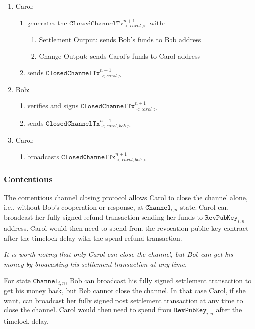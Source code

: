 \documentclass{llncs}
\begin{document}
\begin{enumerate}
\item Carol:
  \begin{enumerate}
  \item generates the $\texttt{ClosedChannelTx}_{<carol>}^{n+1}$ with:
    \begin{enumerate}
    \item Settlement Output: sends Bob's funds to Bob address
    \item Change Output: sends Carol's funds to Carol address
    \end{enumerate}
  \item sends $\texttt{ClosedChannelTx}_{<carol>}^{n+1}$
  \end{enumerate}
\item Bob:
  \begin{enumerate}
  \item verifies and signs $\texttt{ClosedChannelTx}_{<carol>}^{n+1}$
  \item sends $\texttt{ClosedChannelTx}_{<carol,bob>}^{n+1}$
  \end{enumerate}
\item Carol:
  \begin{enumerate}
  \item broadcasts $\texttt{ClosedChannelTx}_{<carol,bob>}^{n+1}$
  \end{enumerate}
\end{enumerate}

\subsubsection{Contentious} The contentious channel closing protocol allows
Carol to close the channel alone, i.e., without Bob's cooperation or response,
at $\texttt{Channel}_{i,n}$ state. Carol can broadcast her fully signed refund
transaction sending her funds to $\texttt{RevPubKey}_{i,n}$ address. Carol would
then need to spend from the revocation public key contract after the timelock
delay with the spend refund transaction.

\textit{It is worth noting that only Carol can close the channel, but Bob can
get his money by broacasting his settlement transaction at any time.}

For state $\texttt{Channel}_{i,n}$, Bob can broadcast his fully signed
settlement transaction to get his money back, but Bob cannot close the
channel. In that case Carol, if she want, can broadcast her fully signed post
settlement transaction at any time to close the channel. Carol would then need
to spend from $\texttt{RevPubKey}_{i,n}$ after the timelock delay.
\end{document}
